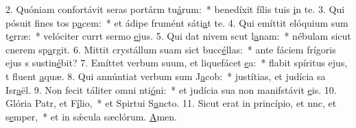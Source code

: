 2. Quóniam confortávit seras portárm tu\uline{á}rum:~* benedíxit fílis tuis \uline{i}n te.
3. Qui pósuit fines tos p\uline{a}cem:~* et ádipe frumént sáti\uline{a}t te.
4. Qui emíttit elóquium sum t\uline{e}rræ:~* velóciter currt sermo \uline{e}jus.
5. Qui dat nivem scut l\uline{a}nam:~* nébulam sicut cnerem sp\uline{a}rgit.
6. Mittit crystállum suam sict bucc\uline{é}llas:~* ante fáciem frígoris ejus s sustin\uline{é}bit?
7. Emíttet verbum suum, et liquefácet \uline{e}a:~* flabit spíritus ejus, t fluent \uline{a}quæ.
8. Qui annúntiat verbum sum J\uline{a}cob:~* justítias, et judícia sa Isr\uline{a}ël.
9. Non fecit táliter omni nti\uline{ó}ni:~* et judícia sua non manifstávit \uline{e}is.
10. Glória Patr, et F\uline{í}lio,~* et Spirtui S\uline{a}ncto.
11. Sicut erat in princípio, et nnc, et s\uline{e}mper,~* et in sǽcula sæclórum. \uline{A}men.

